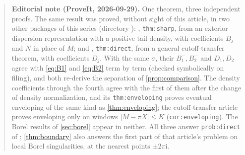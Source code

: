 \documentclass[11pt,a4paper]{article}
\theoremstyle{definition}
\numberwithin{equation}{section}
\newcommand{\ii}{\mathrm{i}}
\begin{document}
\begin{quote}\small\textbf{Editorial note (ProveIt, 2026-09-29).} One theorem, three independent proofs. The same result was proved, without sight of this article, in two other packages of this series (directory ): , \texttt{thm:sharp}, from an exterior dispersion representation with a positive tail density, with coefficients $B_j^-$ and $N$ in place of $M$; and , \texttt{thm:direct}, from a general cutoff-transfer theorem, with coefficients $D_j$. With the same $\sigma$, their $B_1^-,B_2^-$ and $D_1,D_2$ agree with \eqref{eq:B1} and \eqref{eq:B2} term by term (checked symbolically on filing), and both re-derive the separation of \cref{prop:comparison}. The density coefficients through the fourth agree with the first of them after the change of density normalization, and its \texttt{thm:enveloping} proves eventual enveloping of the same kind as \cref{thm:enveloping}; the cutoff-transfer article proves enveloping only on windows $|M-\pi X|\le K$ (\texttt{cor:enveloping}). The Borel results of \cref{sec:borel} appear in neither. All three answer \texttt{prob:direct} of ; \cref{thm:boundary} also answers the first part of that article's problem on local Borel singularities, at the nearest points $\pm2\pi\ii$.\end{quote}
\end{document}
